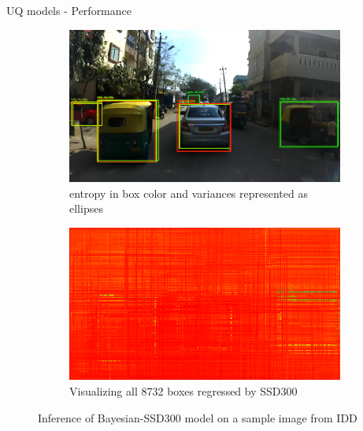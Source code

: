\documentclass[10pt, aspectratio=169]{beamer}
\begin{document}
\begin{frame}[allowframebreaks]{UQ models - Performance}
       \begin{figure}[H]
        \captionsetup[table]{skip=0pt}
           \centering
           \begin{subfigure}[t]{0.495\textwidth}
               \centering
               \includegraphics[width=\textwidth]{images/det_images/idd_bnn_variances_1.png}
               \caption{entropy in box color and variances represented as ellipses}
           \end{subfigure}
           \begin{subfigure}[t]{0.495\textwidth}
               \centering
               \includegraphics[width=\textwidth]{images/det_images/all_bnn_idd_1.png}
               \caption{Visualizing all 8732 boxes regressed by SSD300}
           \end{subfigure}
           \caption{Inference of Bayesian-SSD300 model on a sample image from IDD}
       \end{figure}


\end{frame}
\end{document}

